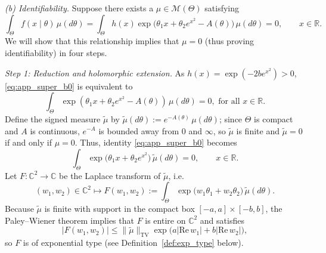 \documentclass[11pt,twoside]{article} %
\begin{document}
\medskip
\emph{(b) Identifiability.}
Suppose there exists a  $\mu\in\mathcal M(\Theta)$ satisfying
\begin{equation}
    \int_\Theta f(x\mid\theta)\,\mu(d\theta)
    =\int_\Theta h(x)\exp\big(\theta_1x+\theta_2e^{x^2}-A(\theta)\big)\,\mu(d\theta)=0,
    \qquad x\in\mathbb R .
    \label{eq:app_super_b0}
\end{equation}
We will show that this relationship implies that $\mu=0$ (thus proving identifiability) in four steps.

\emph{Step 1: Reduction and holomorphic extension.}
As $h(x)=\exp(-2be^{x^2})>0$, \eqref{eq:app_super_b0} is equivalent to
\begin{equation*}
\int_\Theta\exp(\theta_1x+\theta_2e^{x^2}-A(\theta))\,\mu(d\theta)=0, \text{ for all } x \in \mathbb{R}. 
\end{equation*}
Define the signed measure
$\tilde\mu$ by $\tilde\mu(d\theta):=e^{-A(\theta)}\,\mu(d\theta)$; since $\Theta$ is compact and $A$ is
continuous, $e^{-A}$ is bounded away from $0$ and $\infty$, so $\tilde\mu$ is finite and $\tilde\mu=0$ if and only if $\mu=0$. Thus, identity \eqref{eq:app_super_b0} becomes
\begin{equation}
    \int_\Theta\exp\big(\theta_1x+\theta_2e^{x^2}\big)\,\tilde\mu(d\theta)=0,
    \qquad x\in\mathbb R.
    \label{eq:app_super_b1}
\end{equation}
Let $F:\mathbb C^2\to\mathbb C$ be the Laplace transform of $\tilde\mu$, i.e. 
\begin{equation*}
  (w_1,w_2)\in \mathbb{C}^2 \mapsto  F(w_1,w_2):=\int_\Theta\exp\big(w_1\theta_1+w_2\theta_2\big)\,\tilde\mu(d\theta).
\end{equation*}
Because $\tilde\mu$ is finite with support in the compact box $[-a,a]\times[-b,b]$, the Paley--Wiener theorem
implies that $F$ is entire on $\mathbb C^2$ and satisfies
\begin{equation*}
    |F(w_1,w_2)|\le\|\tilde\mu\|_{\mathrm{TV}}\exp\big(a|\mathrm{Re}\,w_1|+b|\mathrm{Re}\,w_2|\big),
\end{equation*}
so $F$ is of exponential type (see Definition~\ref{def:exp_type} below).
\end{document}
